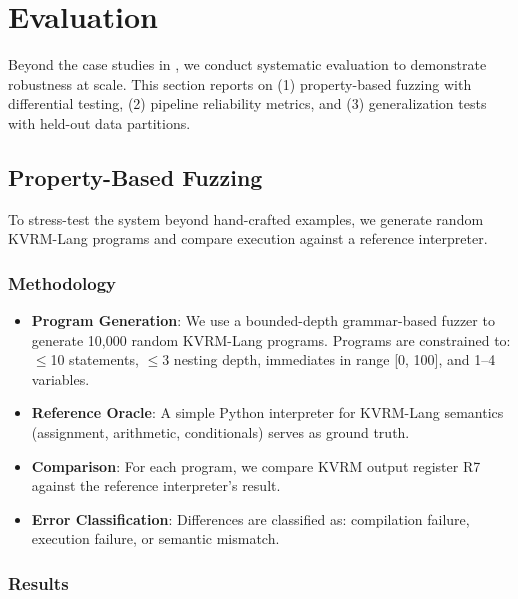 \documentclass[11pt,a4paper]{article}
\begin{document}
\section{Evaluation}
\label{sec:evaluation}

Beyond the case studies in , we conduct systematic evaluation to demonstrate robustness at scale. This section reports on (1) property-based fuzzing with differential testing, (2) pipeline reliability metrics, and (3) generalization tests with held-out data partitions.

\subsection{Property-Based Fuzzing}

To stress-test the system beyond hand-crafted examples, we generate random KVRM-Lang programs and compare execution against a reference interpreter.

\subsubsection{Methodology}

\begin{itemize}
    \item \textbf{Program Generation}: We use a bounded-depth grammar-based fuzzer to generate 10,000 random KVRM-Lang programs. Programs are constrained to: $\leq$10 statements, $\leq$3 nesting depth, immediates in range [0, 100], and 1--4 variables.
    \item \textbf{Reference Oracle}: A simple Python interpreter for KVRM-Lang semantics (assignment, arithmetic, conditionals) serves as ground truth.
    \item \textbf{Comparison}: For each program, we compare KVRM output register R7 against the reference interpreter's result.
    \item \textbf{Error Classification}: Differences are classified as: compilation failure, execution failure, or semantic mismatch.
\end{itemize}

\subsubsection{Results}
\end{document}
